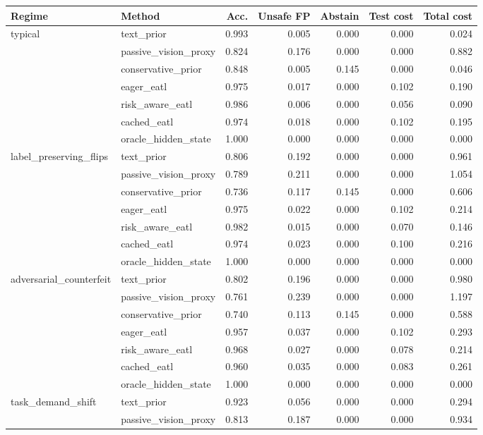 \begin{tabular}{llrrrrr}
\toprule
Regime & Method & Acc. & Unsafe FP & Abstain & Test cost & Total cost \\
\midrule
typical & text\_prior & 0.993 & 0.005 & 0.000 & 0.000 & 0.024 \\
 & passive\_vision\_proxy & 0.824 & 0.176 & 0.000 & 0.000 & 0.882 \\
 & conservative\_prior & 0.848 & 0.005 & 0.145 & 0.000 & 0.046 \\
 & eager\_eatl & 0.975 & 0.017 & 0.000 & 0.102 & 0.190 \\
 & risk\_aware\_eatl & 0.986 & 0.006 & 0.000 & 0.056 & 0.090 \\
 & cached\_eatl & 0.974 & 0.018 & 0.000 & 0.102 & 0.195 \\
 & oracle\_hidden\_state & 1.000 & 0.000 & 0.000 & 0.000 & 0.000 \\
\midrule
label\_preserving\_flips & text\_prior & 0.806 & 0.192 & 0.000 & 0.000 & 0.961 \\
 & passive\_vision\_proxy & 0.789 & 0.211 & 0.000 & 0.000 & 1.054 \\
 & conservative\_prior & 0.736 & 0.117 & 0.145 & 0.000 & 0.606 \\
 & eager\_eatl & 0.975 & 0.022 & 0.000 & 0.102 & 0.214 \\
 & risk\_aware\_eatl & 0.982 & 0.015 & 0.000 & 0.070 & 0.146 \\
 & cached\_eatl & 0.974 & 0.023 & 0.000 & 0.100 & 0.216 \\
 & oracle\_hidden\_state & 1.000 & 0.000 & 0.000 & 0.000 & 0.000 \\
\midrule
adversarial\_counterfeit & text\_prior & 0.802 & 0.196 & 0.000 & 0.000 & 0.980 \\
 & passive\_vision\_proxy & 0.761 & 0.239 & 0.000 & 0.000 & 1.197 \\
 & conservative\_prior & 0.740 & 0.113 & 0.145 & 0.000 & 0.588 \\
 & eager\_eatl & 0.957 & 0.037 & 0.000 & 0.102 & 0.293 \\
 & risk\_aware\_eatl & 0.968 & 0.027 & 0.000 & 0.078 & 0.214 \\
 & cached\_eatl & 0.960 & 0.035 & 0.000 & 0.083 & 0.261 \\
 & oracle\_hidden\_state & 1.000 & 0.000 & 0.000 & 0.000 & 0.000 \\
\midrule
task\_demand\_shift & text\_prior & 0.923 & 0.056 & 0.000 & 0.000 & 0.294 \\
 & passive\_vision\_proxy & 0.813 & 0.187 & 0.000 & 0.000 & 0.934 \\

\end{tabular}

